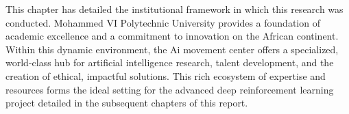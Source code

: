 \documentclass[../Main.tex]{subfiles}
\begin{document}
This chapter has detailed the institutional framework in which this research was conducted. Mohammed VI Polytechnic University provides a foundation of academic excellence and a commitment to innovation on the African continent. Within this dynamic environment, the Ai movement center offers a specialized, world-class hub for artificial intelligence research, talent development, and the creation of ethical, impactful solutions. This rich ecosystem of expertise and resources forms the ideal setting for the advanced deep reinforcement learning project detailed in the subsequent chapters of this report.
\end{document}
